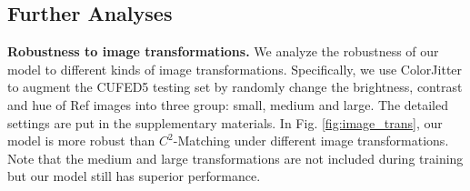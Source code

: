 \documentclass[runningheads]{llncs}
\begin{document}
\begin{table}[t]
\setlength\belowcaptionskip{-5pt}
\setlength\abovecaptionskip{-9pt}
\caption{Performance in terms of different similarity levels on CUFED5 test set.}
\begin{center}
\label{tab:diff_sim}
\end{center}
\end{table}



\subsection{Further Analyses}
\noindent\textbf{Robustness to image transformations.}
We analyze the robustness of our model to different kinds of image transformations.
Specifically, we use ColorJitter to augment the CUFED5 testing set by randomly change the brightness, contrast and hue of Ref images into three group: small, medium and large. 
The detailed settings are put in the supplementary materials.
In Fig. \ref{fig:image_trans}, our model is more robust than $C^2$-Matching \cite{jiang2021robust} under different image transformations.
Note that the medium and large transformations are not included during training but our model still has superior performance.
\end{document}
